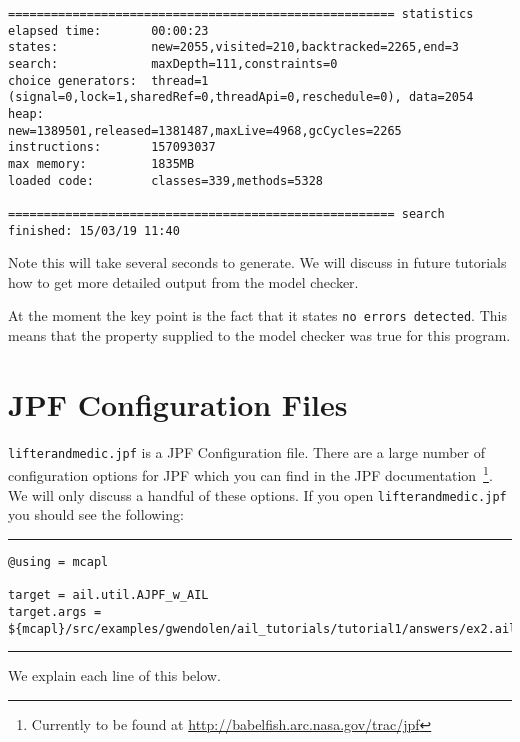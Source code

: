 \begin{verbatim}
====================================================== statistics
elapsed time:       00:00:23
states:             new=2055,visited=210,backtracked=2265,end=3
search:             maxDepth=111,constraints=0
choice generators:  thread=1 (signal=0,lock=1,sharedRef=0,threadApi=0,reschedule=0), data=2054
heap:               new=1389501,released=1381487,maxLive=4968,gcCycles=2265
instructions:       157093037
max memory:         1835MB
loaded code:        classes=339,methods=5328

====================================================== search finished: 15/03/19 11:40
\end{verbatim}

Note this will take several seconds to generate.  We will discuss in future tutorials how to get more detailed output from the model checker.

At the moment the key point is the fact that it states \texttt{no errors detected}.  This means that the property supplied to the model checker was true for this program.

\section{JPF Configuration Files}

\texttt{lifterandmedic.jpf} is a JPF Configuration file.  There are a large number of configuration options for JPF which you can find in the JPF documentation~\footnote{Currently to be found at \url{http://babelfish.arc.nasa.gov/trac/jpf}}.  We will only discuss a handful of these options.  If you open \texttt{lifterandmedic.jpf} you should see the following:

\noindent\rule{\textwidth}{1pt}
\begin{small}
\begin{verbatim}
@using = mcapl

target = ail.util.AJPF_w_AIL
target.args = ${mcapl}/src/examples/gwendolen/ail_tutorials/tutorial1/answers/ex2.ail,${mcapl}/src/examples/gwendolen/ajpf_tutorials/tutorial1/lifterandmedic.psl,1

\end{verbatim}
\end{small}
\rule{\textwidth}{1pt}

We explain each line of this below.

